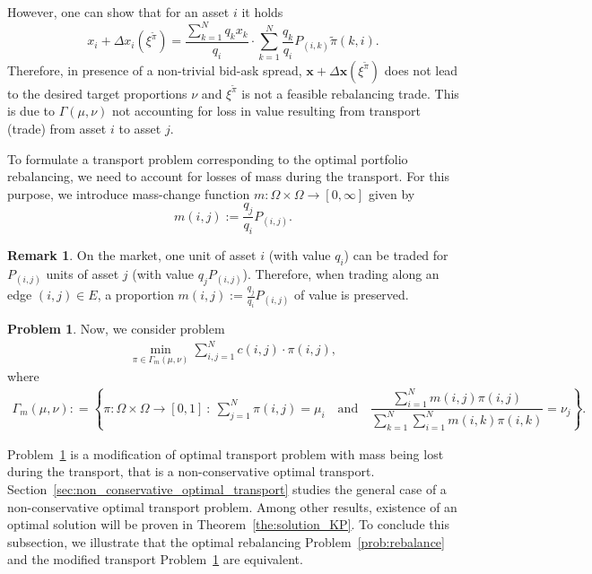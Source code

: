 \documentclass{article}
\theoremstyle{definition}
\newtheorem{remark}[theorem]{Remark}
\newtheorem{problem}[theorem]{Problem}
\def\bx{\mathbf{x}}
\begin{document}
However, one can show that for an asset $i$ it holds
\[
x_i + \Delta x_i (\xi^{\tilde{\pi}}) = \frac{\sum_{k=1}^N q_k x_k}{q_i} \cdot \sum_{k=1}^N \frac{q_k}{q_i} P_{(i,k)} \tilde{\pi} (k, i).
\]
Therefore, in presence of a non-trivial bid-ask spread, $\bx + \Delta \bx(\xi^{\tilde{\pi}})$ does not lead to the desired target proportions $\nu$ and $\xi^{\tilde{\pi}}$ is not a feasible rebalancing trade. This is due to $\Gamma(\mu, \nu)$ not accounting for loss in value resulting from transport (trade) from asset $i$ to asset $j$. 

To formulate a transport problem corresponding to the optimal portfolio rebalancing, we need to account for losses of mass during the transport. For this purpose, we introduce mass-change function $m: \Omega \times \Omega \to [0, \infty]$ given by 
\[
m (i,j) := \frac{q_j}{q_i} P_{(i,j)}.
\]
\begin{remark}
On the market, one unit of asset $i$ (with value $q_i$) can be traded for $P_{(i,j)}$ units of asset $j$ (with value $q_j P_{(i,j)}$). Therefore, when trading along an edge $(i,j) \in E$, a proportion $m (i,j) := \frac{q_j}{q_i} P_{(i,j)}$ of value is preserved.
\end{remark}

\begin{problem} \label{prob:Rebalance-OT2}
Now, we consider problem
\begin{align*}
    \min_{\pi \in \Gamma_m (\mu, \nu)} \sum_{i,j =1}^N c(i,j) \cdot  \pi(i,j),
\end{align*}
 where 
\begin{align*}
    \Gamma_m (\mu, \nu) : = \left\{ \pi: \Omega \times \Omega \to [0,1] \ : \ \sum_{j=1}^N \pi(i,j) = \mu_i \quad \mbox{and} \quad \dfrac{\sum\limits_{i=1}^N m(i,j)\pi(i,j)}{\sum\limits_{k=1}^N\sum\limits_{i=1}^N m(i,k)\pi(i,k)} = \nu_j  \right\}.
\end{align*}
\end{problem}

Problem~\ref{prob:Rebalance-OT2} is a modification of optimal transport problem with mass being lost during the transport, that is a non-conservative optimal transport. Section~\ref{sec:non_conservative_optimal_transport} studies the general case of a non-conservative optimal transport problem. Among other results, existence of an optimal solution will be proven in Theorem~\ref{the:solution_KP}. To conclude this subsection, we illustrate that the optimal rebalancing Problem~\ref{prob:rebalance} and the modified transport Problem~\ref{prob:Rebalance-OT2} are equivalent.
\end{document}
